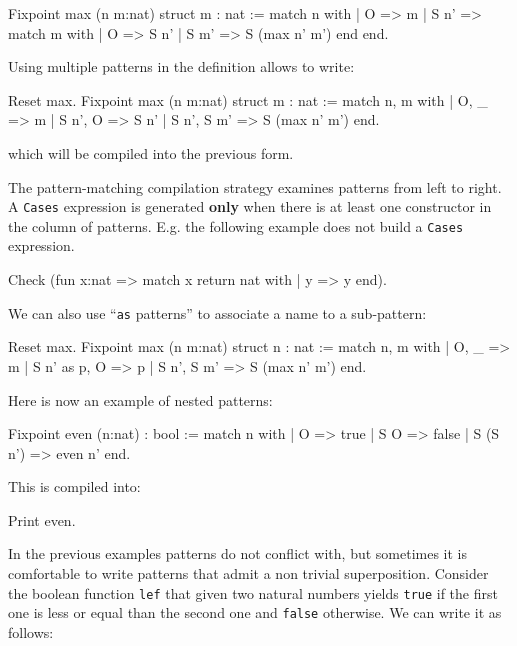 \begin{coq_example}
Fixpoint max (n m:nat) {struct m} : nat :=
  match n with
  | O => m
  | S n' => match m with
            | O => S n'
            | S m' => S (max n' m')
            end
  end.
\end{coq_example}

Using multiple patterns in the definition allows to write:

\begin{coq_example}
Reset max.
Fixpoint max (n m:nat) {struct m} : nat :=
  match n, m with
  | O, _ => m
  | S n', O => S n'
  | S n', S m' => S (max n' m')
  end.
\end{coq_example}

which will be compiled into the previous form.

The pattern-matching compilation strategy examines patterns from left
to right. A \texttt{Cases} expression is generated {\bf only} when
there is at least one constructor in the column of patterns. E.g. the
following example does not build a \texttt{Cases} expression.

\begin{coq_example}
Check (fun x:nat => match x return nat with
                    | y => y
                    end).
\end{coq_example}

We can also use ``\texttt{as} patterns'' to associate a name to a
sub-pattern:

\begin{coq_example}
Reset max.
Fixpoint max (n m:nat) {struct n} : nat :=
  match n, m with
  | O, _ => m
  | S n' as p, O => p
  | S n', S m' => S (max n' m')
  end.
\end{coq_example}

Here is now an example of nested patterns:

\begin{coq_example}
Fixpoint even (n:nat) : bool :=
  match n with
  | O => true
  | S O => false
  | S (S n') => even n'
  end.
\end{coq_example}

This is compiled into:

\begin{coq_example}
Print even.
\end{coq_example}

In the previous examples patterns do not conflict with, but
sometimes it is comfortable to write patterns that admit a non
trivial superposition. Consider
the boolean function \texttt{lef} that given two natural numbers
yields \texttt{true} if the first one is less or equal than the second
one and \texttt{false} otherwise. We can write it as follows:


